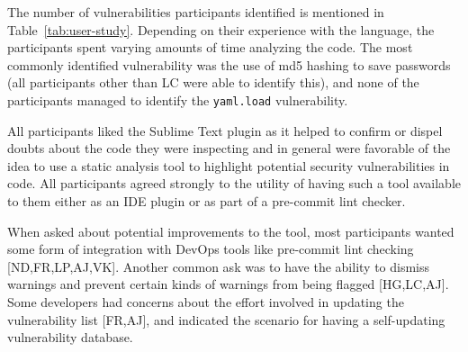 The number of vulnerabilities participants identified is mentioned in Table~\ref{tab:user-study}. Depending on their experience with the language, the participants spent varying amounts of time analyzing the code. The most commonly identified vulnerability was the use of md5 hashing to save passwords (all participants other than LC were able to identify this), and none of the participants managed to identify the \texttt{yaml.load} vulnerability. 

All participants liked the Sublime Text plugin as it helped to confirm or dispel doubts about the code they were inspecting and in general were favorable of the idea to use a static analysis tool to highlight potential security vulnerabilities in code. All participants agreed strongly to the utility of having such a tool available to them either as an IDE plugin or as part of a pre-commit lint checker. 

When asked about potential improvements to the tool, most participants wanted some form of integration with DevOps tools like pre-commit lint checking [ND,FR,LP,AJ,VK]. Another common ask was to have the ability to dismiss warnings and prevent certain kinds of warnings from being flagged [HG,LC,AJ]. Some developers had concerns about the effort involved in updating the vulnerability list [FR,AJ], and indicated the scenario for having a self-updating vulnerability database.


